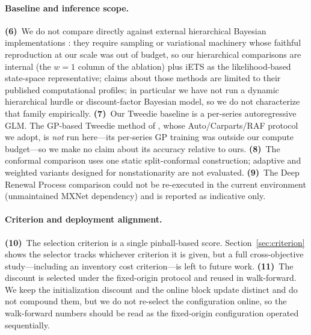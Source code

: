 \documentclass[twocolumn,10pt]{article}
\begin{document}
\paragraph{Baseline and inference scope.}
\textbf{(6)}~We do not compare directly against external
hierarchical Bayesian implementations
\citep{chapados2014,seeger2016,pitkin2024}: they require sampling or
variational machinery whose faithful reproduction at our scale was out
of budget, so our hierarchical comparisons are internal (the $w{=}1$
column of the ablation) plus iETS as the likelihood-based state-space
representative; claims about those methods are limited to their
published computational profiles; in particular we have not run a
dynamic hierarchical hurdle or discount-factor Bayesian model, so we do
not characterize that family empirically. \textbf{(7)}~Our Tweedie
baseline is a per-series autoregressive GLM. The GP-based Tweedie method
of \citet{damato2025}, whose Auto/Carparts/RAF protocol we adopt, is
\emph{not} run here---its per-series GP training was outside our compute
budget---so we make no claim about its accuracy relative to ours.
\textbf{(8)}~The conformal comparison uses one static split-conformal
construction; adaptive and weighted variants designed for nonstationarity
are not evaluated. \textbf{(9)}~The Deep Renewal Process comparison could
not be re-executed in the current environment (unmaintained MXNet
dependency) and is reported as indicative only.

\paragraph{Criterion and deployment alignment.}
\textbf{(10)}~The selection criterion is a single pinball-based score.
Section~\ref{sec:criterion} shows the selector tracks whichever criterion
it is given, but a full cross-objective study---including an inventory
cost criterion---is left to future work.
\textbf{(11)}~The discount is selected under the fixed-origin protocol
and reused in walk-forward. We keep the initialization discount and the
online block update distinct and do not compound them, but we do not
re-select the configuration online, so the walk-forward numbers should be
read as the fixed-origin configuration operated sequentially.

\end{document}
